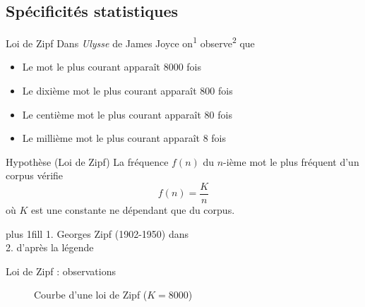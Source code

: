 \documentclass[hyperref={unicode}, xcolor={svgnames}, french]{beamer}
\begin{document}
\subsection{Spécificités statistiques}
\begin{frame}{Loi de Zipf}
    Dans \textit{Ulysse} de James Joyce on\textsuperscript{1} observe\textsuperscript{2} que
    \begin{itemize}
        \item Le mot le plus courant apparaît \num{8000} fois
        \item Le dixième mot le plus courant apparaît \num{800} fois
        \item Le centième mot le plus courant apparaît \num{80} fois
        \item Le millième mot le plus courant apparaît \num{8} fois
    \end{itemize}

    \begin{block}{Hypothèse (Loi de Zipf)}
        La fréquence $f(n)$ du $n$-ième mot le plus fréquent d'un corpus vérifie
        \begin{equation}
            f(n) = \frac{K}{n}
        \end{equation}
        où $K$ est une constante ne dépendant que du corpus.
    \end{block}
    \vskip0pt plus 1fill
    {\tiny 1. Georges Zipf (1902-1950) dans \parencite{zipf1949human}\\2. d'après la légende}
\end{frame}

\begin{frame}{Loi de Zipf : observations}
    \begin{figure}
        \tikzset{external/export=true}
        \caption{Courbe d'une loi de Zipf ($K=\num{8000}$)}
    \end{figure}
\end{frame}
\end{document}
